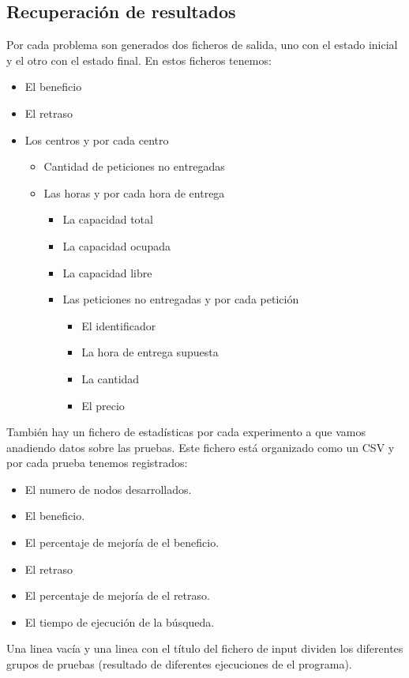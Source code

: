 \documentclass{article}
\begin{document}
\subsection{Recuperación de resultados}
Por cada problema son generados dos ficheros de salida, uno con el estado inicial y el otro con el estado final. En estos ficheros tenemos:
\begin{itemize}
\item El beneficio
\item El retraso
\item Los centros y por cada centro
	\begin{itemize}
		\item Cantidad de peticiones no entregadas
		\item Las horas y por cada hora de entrega
		\begin{itemize}		
			\item La capacidad total
			\item La capacidad ocupada
			\item La capacidad libre
			\item Las peticiones no entregadas y por cada petición		
			\begin{itemize}
			\item El identificador
			\item La hora de entrega supuesta
			\item La cantidad
			\item El precio
			\end{itemize}
		\end{itemize}
	\end{itemize}
\end{itemize}
También hay un fichero de estadísticas por cada experimento a que vamos anadiendo datos sobre las pruebas. Este fichero está organizado como un CSV y por cada prueba tenemos registrados:
\begin{itemize}
\item El numero de nodos desarrollados. 
\item El beneficio.
\item El percentaje de mejoría de el beneficio.
\item El retraso
\item El percentaje de mejoría de el retraso.
\item El tiempo de ejecución de la búsqueda.
\end{itemize}
Una linea vacía y una linea con el título del fichero de input dividen los diferentes grupos de pruebas (resultado de diferentes ejecuciones de el programa).
\end{document}
